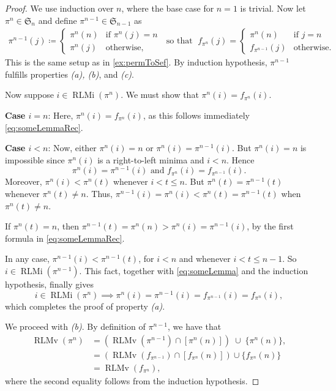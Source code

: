 \documentclass[reqno]{amsart}
\theoremstyle{definition}
\newcommand{\symS}{\mathfrak{S}}
\DeclareMathOperator{\RLMv}{RLMv}
\DeclareMathOperator{\RLMi}{RLMi}
\begin{document}
\begin{proof}
We use induction over $n$, where the base case for $n=1$ is trivial.
%
Now let $\pi^n \in\symS_n$ and define $\pi^{n-1} \in \symS_{n-1}$  as
\begin{align}\label{eq:someLemmaRec}
    \pi^{n-1}(j) \coloneqq \begin{cases}
             \pi^{n}(n) &\text{if }\pi^n(j)=n\\
             \pi^{n}(j) &\text{otherwise},
			\end{cases}
\; \text{ so that } \; 
f_{\pi^n}(j)=\begin{cases}
             \pi^n(n) &\text{if }j=n\\
             f_{\pi^{n-1}}(j) &\text{otherwise.}
             \end{cases}
\end{align}
This is the same setup as in \cref{ex:permToSef}.
By induction hypothesis, 
$\pi^{n-1}$ fulfills properties \textit{(a), (b)}, and \textit{(c)}.


\medskip 
\noindent
Now suppose $i \in \RLMi(\pi^n)$. 
We must show that $\pi^n(i)=f_{\pi^n}(i)$.

\noindent
\textbf{Case $i=n$}:
 Here, $\pi^n(i) = f_{\pi^n}(i)$, as this follows immediately \eqref{eq:someLemmaRec}.

\noindent
\textbf{Case $i<n$}: 
Now, either $\pi^n(i)=n$ or $\pi^n(i)=\pi^{n-1}(i)$. 
But $\pi^n(i)=n$ is impossible since $\pi^n(i)$ is a right-to-left minima and $i<n$.
Hence 
\begin{equation}\label{eq:someLemma}
 \pi^n(i)=\pi^{n-1}(i) \text{ and } f_{\pi^n}(i)=f_{\pi^{n-1}}(i).
\end{equation}
\medskip 
Moreover, $\pi^n(i) < \pi^n(t)$ whenever $i < t \leq n$. But $\pi^n(t)=\pi^{n-1}(t)$ whenever $\pi^n(t)\neq n$. Thus, $\pi^{n-1}(i)= \pi^n(i)<\pi^n(t)=\pi^{n-1}(t)$ when $\pi^n(t)\neq n$.


\noindent If $\pi^n(t)=n$, then $\pi^{n-1}(t)=\pi^n(n)>\pi^n(i)=\pi^{n-1}(i)$, by the first formula in
 \eqref{eq:someLemmaRec}.  
 
\medskip
\noindent In any case, $\pi^{n-1}(i)<\pi^{n-1}(t)$, for $i<n$ and whenever $i < t \leq n-1$. So $i \in \RLMi(\pi^{n-1})$. This fact, together
with \eqref{eq:someLemma} and the induction hypothesis, 
finally gives
\[
i\in \RLMi(\pi^n) \implies \pi^n(i) = \pi^{n-1}(i)=f_{\pi^{n-1}}(i)=f_{\pi^n}(i),
\]
which completes the proof of property \textit{(a)}.

\medskip 
\noindent
We proceed with \textit{(b)}. 
By definition of $\pi^{n-1}$, we have that
\begin{align*}
    \RLMv(\pi^n) &=(\RLMv(\pi^{n-1})\cap [\pi^n(n)]) \; \cup \; \{\pi^n(n)\},  \\
    &=(\RLMv(f_{\pi^{n-1}})\cap[f_{\pi^n}(n)])\cup\{f_{\pi^n}(n)\}\\
    &=\RLMv(f_{\pi^n}),
\end{align*}
where the second equality follows from the induction hypothesis.


\end{proof}
\end{document}
